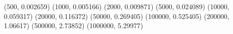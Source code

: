 (500, 0.002659) (1000, 0.005166) (2000, 0.009871) (5000, 0.024089) (10000, 0.059317) (20000, 0.116372) (50000, 0.269405) (100000, 0.525405) (200000, 1.06617) (500000, 2.73852) (1000000, 5.29977) 